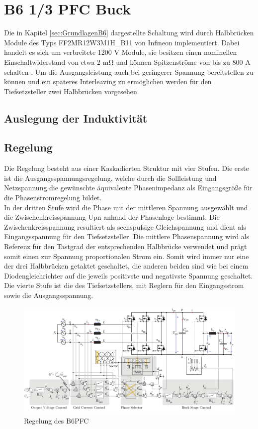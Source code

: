 \section{B6 1/3 PFC Buck}
Die in Kapitel \ref{sec:GrundlagenB6} dargestellte Schaltung wird durch Halbbrücken Module des Typs FF2MR12W3M1H\_B11 von Infineon implementiert. Dabei handelt es sich um verbreitete 1200 \si{\volt} Module, sie besitzen einen nominellen Einschaltwiderstand von etwa 2 \si{\milli \ohm} und können Spitzenströme von bis zu 800 \si{\ampere} schalten \cite{IFAGFF2}. Um die Ausgangsleistung auch bei geringerer Spannung bereitstellen zu können und ein späteres Interleaving zu ermöglichen werden für den Tiefsetzsteller zwei Halbbrücken vorgesehen.

	\subsection{Auslegung der Induktivität}
	
	
	\subsection{Regelung}
	Die Regelung besteht aus einer Kaskadierten Struktur mit vier Stufen. Die erste ist die Ausgangsspannungsregelung, welche durch die Sollleistung und Netzspannung die gewünschte äquivalente Phasenimpedanz als Eingangsgröße für die Phasenstromregelung bildet.\\
	In der dritten Stufe wird die Phase mit der mittleren Spannung ausgewählt und die Zwischenkreisspannung \gls{Upn} anhand der Phasenlage bestimmt. Die Zwischenkreisspannung resultiert als sechspulsige Gleichspannung und dient als Eingangsspannung für den Tiefsetzsteller. Die mittlere Phasenspannung wird als Referenz für den Tastgrad der entsprechenden Halbbrücke verwendet und prägt somit einen zur Spannung proportionalen Strom ein. Somit wird immer nur eine der drei Halbbrücken getaktet geschaltet, die anderen beiden sind wie bei einem Diodengleichrichter auf die jeweils positivste und negativste Spannung geschaltet.\\
	Die vierte Stufe ist die des Tiefsetzstellers, mit Reglern für den Eingangsstrom sowie die Ausgangsspannung.
	
	\begin{figure}
		\centering
		\includegraphics[width=0.9\linewidth]{content/Grafiken/B6-Control-orig}
		\caption[Regelung des \gls{B6PFC}]{Regelung des \gls{B6PFC} \cite{13PWMPFC}}
		\label{fig:b6-control-orig}
	\end{figure}
